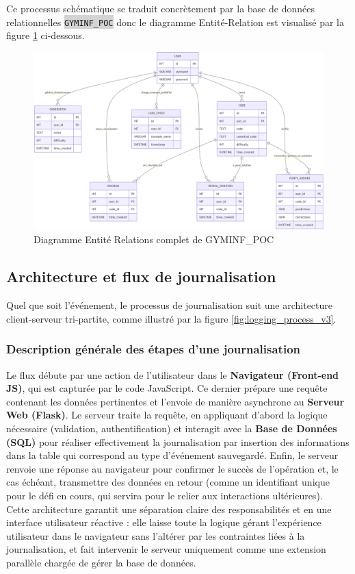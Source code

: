 \documentclass[11pt,a4paper]{article}
\newcommand{\code}[1]{\colorbox{lightgray}{\texttt{\small #1}}}
\begin{document}
Ce processus schématique se traduit concrètement par la base de données relationnelles \code{GYMINF\_POC} donc le diagramme Entité-Relation est visualisé par la figure \ref{fig:ERD} ci-dessous.
\begin{landscape}
\begin{figure}

    \centering
    \includegraphics[width=1.5\textwidth]{erDiagram_logging.png}
    \caption{Diagramme Entité Relations complet de GYMINF\_POC}
    \label{fig:ERD}
\end{figure}
\end{landscape}

\subsection{Architecture et flux de journalisation}
Quel que soit l'événement, le processus de journalisation suit une architecture client-serveur tri-partite, comme illustré par la figure \ref{fig:logging_process_v3}.

\subsubsection{Description générale des étapes d'une journalisation}
Le flux débute par une action de l'utilisateur dans le \textbf{Navigateur (Front-end JS)}, qui est capturée par le code JavaScript. Ce dernier prépare une requête contenant les données pertinentes et l'envoie de manière asynchrone au \textbf{Serveur Web (Flask)}. Le serveur traite la requête, en appliquant d'abord la logique nécessaire (validation, authentification) et interagit avec la \textbf{Base de Données (SQL)} pour réaliser effectivement la journalisation par insertion des informations dans la table qui correspond au type d'événement sauvegardé. Enfin, le serveur renvoie une réponse au navigateur pour confirmer le succès de l'opération et, le cas échéant, transmettre des données en retour (comme un identifiant unique pour le défi en cours, qui servira pour le relier aux interactions ultérieures). \\Cette architecture garantit une séparation claire des responsabilités et en 
une interface utilisateur réactive : elle laisse toute la logique gérant l'expérience utilisateur dans le navigateur sans l'altérer par les contraintes liées à la journalisation, et fait intervenir le serveur uniquement comme une extension parallèle chargée de gérer la base de données.
\end{document}

